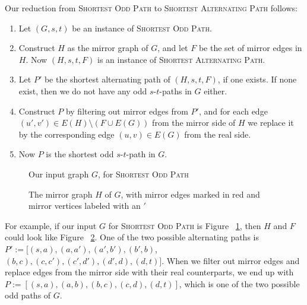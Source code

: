 Our reduction from \textsc{Shortest Odd Path} to \textsc{Shortest Alternating Path} follows:
\begin{enumerate}
    \item Let $(G, s, t)$ be an instance of \textsc{Shortest Odd Path}.
    \item Construct $H$ as the mirror graph of $G$, and let $F$ be the set of mirror edges in $H$. Now $(H, s, t, F)$ is an instance of \textsc{Shortest Alternating Path}.
    \item Let $P'$ be the shortest alternating path of $(H, s, t, F)$, if one exists. If none exist, then we do not have any odd $s$-$t$-paths in $G$ either.
    \item Construct $P$ by filtering out mirror edges from $P'$, and for each edge $(u',v') \in E(H) \setminus (F \cup E(G))$ from the mirror side of $H$ we replace it by the corresponding edge $(u,v) \in E(G)$ from the real side.
    \label{translate_alternating_path}
    \item Now $P$ is the shortest odd $s$-$t$-path in $G$.
\end{enumerate}

\begin{figure}
    \centering
    
    \caption{Our input graph $G$, for \textsc{Shortest Odd Path}}
    \label{small5}
\end{figure}

\begin{figure}
    \centering
    
    \caption{The mirror graph $H$ of $G$, with mirror edges marked in red and mirror vertices labeled with an $'$}
    \label{small5-2}
\end{figure}

For example, if our input $G$ for \textsc{Shortest Odd Path} is Figure ~\ref{small5}, then $H$ and $F$ could look like Figure ~\ref{small5-2}. One of the two possible alternating paths is $P' := [(s,a), (a, a'), (a',b'), (b',b)$, $(b,c), (c,c'), (c',d'), (d',d), (d,t)]$. When we filter out mirror edges and replace edges from the mirror side with their real counterparts, we end up with $P := [(s,a),(a,b),(b,c),(c,d),(d,t)]$, which is one of the two possible odd paths of $G$. 

